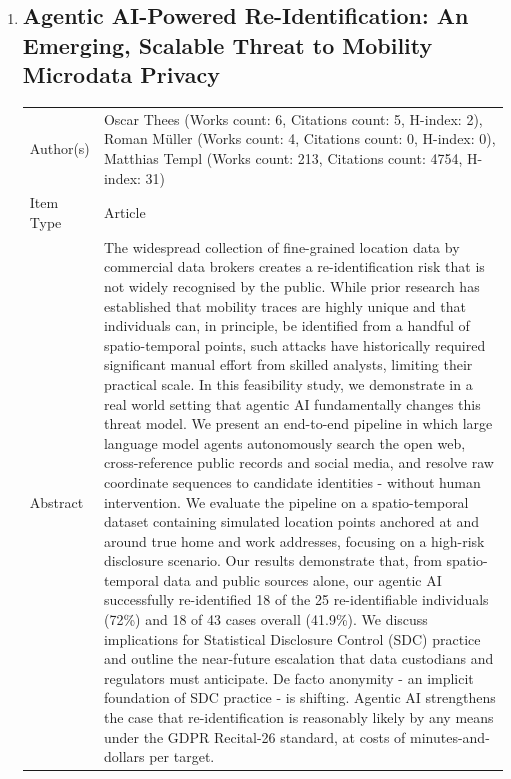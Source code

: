 \documentclass{article}
\begin{document}
\begin{enumerate}[label=\arabic*., font=\Large]
\item
{}\label{agentic-ai-powered-re-identification-an-emerging-scalable-threat-to-mobility-microdata-privacy}
\hypertarget{item_THEESAgenticAIPoweredReIdentificationEmergingScalableThreat2026}{}
\subsection*{Agentic AI-Powered Re-Identification: An Emerging, Scalable Threat to Mobility Microdata Privacy}

\begin{longtable}{p{} p{\contentcolwidth-2\tabcolsep}}
\toprule
Author(s) & Oscar Thees (Works count: 6, Citations count: 5, H-index: 2), Roman Müller (Works count: 4, Citations count: 0, H-index: 0), Matthias Templ (Works count: 213, Citations count: 4754, H-index: 31) \\
Item Type & Article \\
Abstract & The widespread collection of fine-grained location data by commercial data brokers creates a re-identification risk that is not widely recognised by the public. While prior research has established that mobility traces are highly unique and that individuals can, in principle, be identified from a handful of spatio-temporal points, such attacks have historically required significant manual effort from skilled analysts, limiting their practical scale. In this feasibility study, we demonstrate in a real world setting that agentic AI fundamentally changes this threat model. We present an end-to-end pipeline in which large language model agents autonomously search the open web, cross-reference public records and social media, and resolve raw coordinate sequences to candidate identities - without human intervention. We evaluate the pipeline on a spatio-temporal dataset containing simulated location points anchored at and around true home and work addresses, focusing on a high-risk disclosure scenario. Our results demonstrate that, from spatio-temporal data and public sources alone, our agentic AI successfully re-identified 18 of the 25 re-identifiable individuals (72\%) and 18 of 43 cases overall (41.9\%). We discuss implications for Statistical Disclosure Control (SDC) practice and outline the near-future escalation that data custodians and regulators must anticipate. De facto anonymity - an implicit foundation of SDC practice - is shifting. Agentic AI strengthens the case that re-identification is reasonably likely by any means under the GDPR Recital-26 standard, at costs of minutes-and-dollars per target. \\

\end{longtable}
\end{enumerate}
\end{document}
